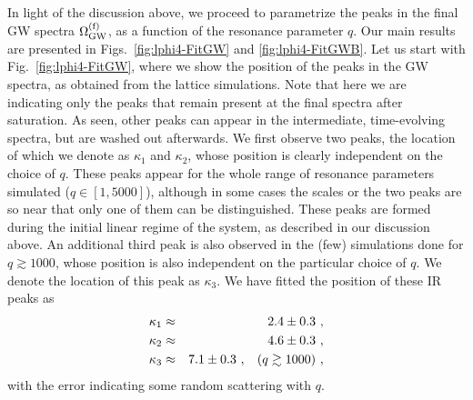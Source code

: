 \documentclass[a4paper,11pt]{article}
\newcommand{\bea}{\begin{eqnarray}}
\newcommand{\eea}{\end{eqnarray}}
\begin{document}
In light of the discussion above, we proceed to parametrize the peaks in the final GW spectra $\Omega_{\rm GW}^{\rm (f)}$, as a function of the resonance parameter $q$. Our main results are presented in Figs.~\ref{fig:lphi4-FitGW} and \ref{fig:lphi4-FitGWB}. Let us start with Fig.~\ref{fig:lphi4-FitGW}, where we show the position of the peaks in the GW spectra, as obtained from the lattice simulations. Note that here we are indicating only the peaks that remain present at the final spectra after saturation. As seen, other peaks can appear in the intermediate, time-evolving spectra, but are washed out afterwards. We first observe two peaks, the location of which we denote as $\kappa_1$ and $\kappa_2$, whose position is clearly independent on the choice of $q$. These peaks appear for the whole range of resonance parameters simulated ($q \in  [1,5000]$), although in some cases the scales or the two peaks are so near that only one of them can be distinguished. These peaks are formed during the initial linear regime of the system, as described in our discussion above. An additional third peak is also observed in the (few) simulations done for $q \gtrsim 1000$, whose position is also independent on the particular choice of $q$. We denote the location of this peak as $\kappa_3$. We have fitted the position of these IR peaks as
\bea  \kappa_1 &\approx & 2.4 \pm 0.3 \label{eq:lphi4-fitspectra1} \ , \\
 \kappa_2 &\approx & 4.6 \pm 0.3  \label{eq:lphi4-fitspectra2}\ , \\
\kappa_3 &\approx & 7.1 \pm 0.3  \label{eq:lphi4-fitspectra3} \ , \hspace{0.3cm} (q \gtrsim 1000)  \ ,  \eea
with the error indicating some random scattering with $q$. 
\end{document}
